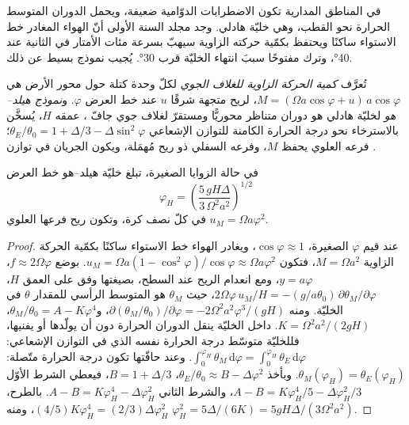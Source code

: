 في المناطق المدارية تكون الاضطرابات الدوّامية ضعيفة، ويحمل الدوران المتوسط الحرارة
نحو القطب، وهي خليّة هادلي. وجد مجلد السنة الأولى أنّ الهواء المغادر
خط الاستواء ساكنًا ويحتفظ بكمّية حركته الزاوية سيهبّ بسرعة مئات
الأمتار في الثانية عند \ang{40}، وترك مفتوحًا سببَ انتهاء الخليّة قرب
\ang{30}. يُجيب نموذج بسيط عن ذلك.

\begin{definition}\label{def:b3:atmospheric-dynamics:held-hou}
تُعرَّف \emph{كمية الحركة الزاوية للغلاف الجوي}
لكلّ وحدة كتلة حول محور الأرض هي $M = (\Omega a\cos\varphi +
u)\,a\cos\varphi$، لريح متجهة شرقًا $u$ عند خط العرض $\varphi$.
و\emph{نموذج هيلد--هو} لخليّة هادلي هو دوران
متناظر محوريًّا ومستقرّ لغلاف جوي جافّ ، عمقه
$H$، يُسخَّن بالاسترخاء نحو درجة الحرارة الكامنة للتوازن الإشعاعي
$\theta_E/\theta_0 = 1 + \Delta/3 - \Delta\sin^2\varphi$؛ فرعه
العلوي يحفظ $M$، وفرعه السفلي ذو ريح مُهمَلة،
ويكون الجريان في توازن .
\end{definition}

\begin{theorem}\label{thm:b3:atmospheric-dynamics:held-hou}
في حالة الزوايا الصغيرة، تبلغ خليّة هيلد--هو خط العرض
\[
\varphi_H = \left(\frac{5\,gH\Delta}{3\,\Omega^2a^2}\right)^{1/2}
\]
في كلّ نصف كرة، وتكون ريح فرعها العلوي $u_M = \Omega
a\varphi^2$.
\end{theorem}

\begin{proof}
عند قيم $\varphi$ الصغيرة، $\cos\varphi \approx 1$، ويغادر الهواء خط الاستواء
ساكنًا بكمّية الحركة الزاوية $M = \Omega a^2$، فتكون $u_M = \Omega a(1 - \cos^2\varphi)/\cos\varphi
\approx \Omega a\varphi^2$. بوضع $f \approx 2\Omega\varphi$، $y = a\varphi$،
ومع انعدام الريح عند السطح،  بصيغتها وفق  على
العمق $H$، $2\Omega\varphi\,u_M/H = -(g/a\theta_0)\,\partial\theta_M/
\partial\varphi$، حيث $\theta_M$ هو المتوسط الرأسي للمقدار $\theta$ في
الخليّة. ومنه $\partial(\theta_M/\theta_0)/\partial\varphi = -2\Omega^2a^2
\varphi^3/(gH)$، و$\theta_M/\theta_0 = A - K\varphi^4$، $K = \Omega^2a^2/
(2gH)$. داخل الخليّة ينقل الدوران الحرارة دون أن يولّدها أو
يفنيها، فللخليّة متوسّط درجة الحرارة نفسه الذي في
التوازن الإشعاعي: $\int_0^{\varphi_H}\theta_M\,\mathrm d\varphi = \int_0^{\varphi_H}
\theta_E\,\mathrm d\varphi$. وعند حافّتها تكون درجة الحرارة متّصلة:
$\theta_M(\varphi_H) = \theta_E(\varphi_H)$. وبأخذ $\theta_E/\theta_0 \approx
B - \Delta\varphi^2$، $B = 1 + \Delta/3$، فيعطي الشرط الأوّل $A - B =
K\varphi_H^4/5 - \Delta\varphi_H^2/3$، والشرط الثاني $A - B = K\varphi_H^4 -
\Delta\varphi_H^2$. بالطرح، $(4/5)K\varphi_H^4 = (2/3)\Delta
\varphi_H^2$، ومنه $\varphi_H^2 = 5\Delta/(6K) = 5gH\Delta/(3\Omega^2a^2)$.
\end{proof}

